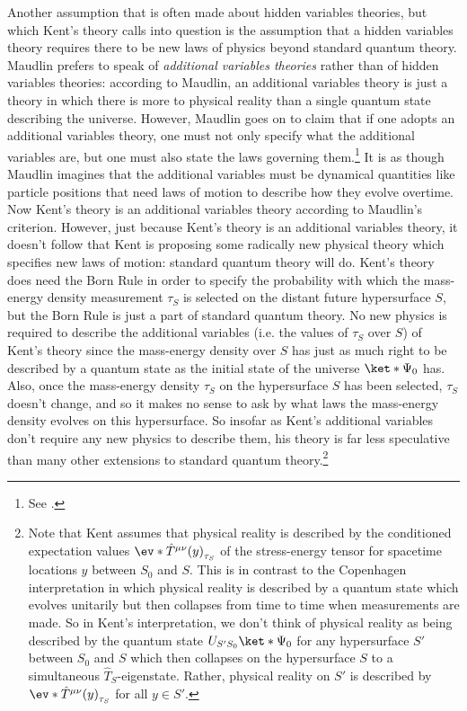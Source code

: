 \documentclass[12pt]{report}
\begin{document}
Another assumption that is often made about hidden variables theories, but which Kent's theory calls into question is the assumption that a hidden variables theory requires there to be new laws of physics beyond standard quantum theory.  Maudlin prefers to speak of \emph{additional variables theories} rather than of hidden variables theories: according to Maudlin, an additional variables theory is just a theory in which there is more to physical reality than a single quantum state describing the universe. However, Maudlin goes on to claim that if one adopts  an additional variables theory, one must not only specify what the additional variables are, but one must also state the laws governing them.\footnote{See \cite[9]{MAUDLINT1995Tmp}. } It is as though Maudlin  imagines that the additional variables must be dynamical quantities like particle positions that need laws of motion to describe how they evolve overtime. Now Kent's theory is an additional variables theory according to Maudlin's criterion. However, just because Kent's theory is an additional variables theory, it doesn't follow that Kent is proposing some radically new physical theory which specifies new laws of motion: standard quantum theory will do. Kent's theory does need the Born Rule in order to specify the probability with which the mass-energy density measurement $\tau_S$ is selected on the distant future hypersurface $S$, but the Born Rule is just a part of standard quantum theory. No new physics is required to describe the additional variables (i.e. the values of $\tau_S$ over $S$)  of Kent's theory since the mass-energy density over $S$ has just as much right to be described by a quantum state as the initial state  of the universe $\ket*{\Psi_0}$ has. Also, once the mass-energy density $\tau_S$ on the hypersurface $S$ has been selected, $\tau_S$ doesn't change, and so it makes no sense to ask by what laws the mass-energy density evolves on this hypersurface. So insofar as Kent's additional variables don't require any new physics to describe them, his theory is far less speculative than many other extensions to standard quantum theory.\footnote{Note that Kent assumes that physical reality is described by the conditioned expectation values $\ev*{\hat{T}^{\mu\nu}(y)}_{\tau_S}$ of the stress-energy tensor for spacetime locations $y$ between $S_0$ and $S$. This is in contrast to the Copenhagen interpretation in which physical reality is described by a quantum state which evolves unitarily but then collapses from time to time when measurements are made. So in Kent's interpretation, we don't think of  physical reality as being described by the quantum state $U_{S'S_0}\ket*{\Psi_0}$ for any hypersurface $S'$ between $S_0$ and $S$ which then collapses on the hypersurface $S$ to a simultaneous $\hat{T}_S$-eigenstate. Rather, physical reality on $S'$ is described by $\ev*{\hat{T}^{\mu\nu}(y)}_{\tau_S}$ for all $y\in S'$. } 
\end{document}

